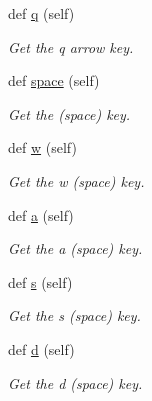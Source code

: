 \begin{DoxyCompactItemize}
def \hyperlink{classbridges_1_1input__helper_1_1_input_helper_a85de78fab5f34c3969af7c1bc0c1e97b}{q} (self)
\begin{DoxyCompactList}\small\item\em Get the \textquotesingle{}q\textquotesingle{} arrow key. \end{DoxyCompactList}\item 
def \hyperlink{classbridges_1_1input__helper_1_1_input_helper_a765e389cd5becacf3880debf4678715b}{space} (self)
\begin{DoxyCompactList}\small\item\em Get the \textquotesingle{} \textquotesingle{} (space) key. \end{DoxyCompactList}\item 
def \hyperlink{classbridges_1_1input__helper_1_1_input_helper_a7f8ea223e81a31d094ea16cc7d4ce1e3}{w} (self)
\begin{DoxyCompactList}\small\item\em Get the \textquotesingle{}w\textquotesingle{} (space) key. \end{DoxyCompactList}\item 
def \hyperlink{classbridges_1_1input__helper_1_1_input_helper_ab46a28fb36f78208840e1bc49f523d71}{a} (self)
\begin{DoxyCompactList}\small\item\em Get the \textquotesingle{}a\textquotesingle{} (space) key. \end{DoxyCompactList}\item 
def \hyperlink{classbridges_1_1input__helper_1_1_input_helper_a2b08296f9bfe269c481bca1e7a030a53}{s} (self)
\begin{DoxyCompactList}\small\item\em Get the \textquotesingle{}s\textquotesingle{} (space) key. \end{DoxyCompactList}\item 
def \hyperlink{classbridges_1_1input__helper_1_1_input_helper_a1eade5f8acf2f1c85671c90cdfcaf57e}{d} (self)
\begin{DoxyCompactList}\small\item\em Get the \textquotesingle{}d\textquotesingle{} (space) key. \end{DoxyCompactList}\end{DoxyCompactItemize}
